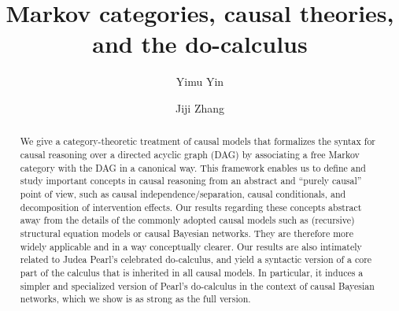 \documentclass[12pt]{amsart}
\title{Markov categories, causal theories, and the do-calculus}
\author[Y. Yin]{Yimu Yin}
\author[J. Zhang]{Jiji Zhang}
\theoremstyle{plain}
\theoremstyle{definition}
\theoremstyle{remark}
\numberwithin{equation}{section}
\theoremstyle{plain}
\newcommand{\0}{\emptyset}
\begin{document}
\begin{abstract}
We give a category-theoretic treatment of causal models that formalizes the syntax for causal reasoning over a directed acyclic graph (DAG) by associating a free Markov category with  the DAG in a canonical way.  This framework enables us to define and study important concepts in causal reasoning from an abstract and ``purely causal'' point of view,  such as causal independence/separation,  causal conditionals,  and decomposition of intervention effects.  Our results regarding these concepts abstract away from the details of the commonly adopted causal models such as (recursive) structural equation models or causal Bayesian networks.  They are therefore more widely applicable and in a way conceptually clearer.  Our results are also intimately related to Judea Pearl's celebrated do-calculus,  and yield a syntactic version of a core part of the calculus that is inherited in all causal models.  In particular,  it induces a simpler and specialized version of Pearl's do-calculus in the context of causal Bayesian networks,  which we show is as strong as the full version.
\end{abstract}

\maketitle
\end{document}
